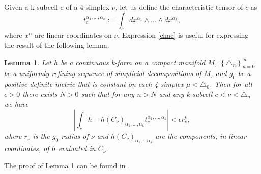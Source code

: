 \documentclass{article}
\newtheorem{lemma}{Lemma}
\begin{document}
Given a k-subcell c of a 4-simplex $\nu$, let us define the characteristic tensor of $c$ as
\begin{equation}\label{chac}
	t_{c}^{\alpha_1,\dots,\alpha_k}:=\int_{c}dx^{\alpha_1}\wedge\dots\wedge dx^{\alpha_k} , 
\end{equation}	
where $x^{\alpha}$ are linear coordinates on $\nu$. Expression \eqref{chac} is useful for expressing the result of the following lemma.
\begin{lemma}\label{lemma2}
	Let $h$ be a continuous k-form on a compact manifold $M$, $\left\{\triangle_n\right\}_{n=0}^{\infty}$ be a uniformly refining sequence of simplicial decompositions of $M$, and $g_0$ be a positive definite metric that is constant on each 4-simplex $\mu<\triangle_{0}$. Then for all $\epsilon>0$ there exists $N>0$ such that for any $n>N$ and any k-subcell $c<\nu<\triangle_{n}$ we have 
	\begin{equation}\label{aux1}
		\left|\int_{c}h-h\left(C_{\nu}\right)_{\alpha_1,\dots,\alpha_k}t_{c}^{\alpha_1,\dots,\alpha_k}\right|<\epsilon r_{\nu}^{k},
	\end{equation}
	where $r_{\nu}$ is the $g_0$ radius of $\nu$ and $h(C_{\nu})_{\alpha_1,\dots\alpha_k}$ are the components, in linear coordinates, of $h$ evaluated in $C_{\nu}$.	
\end{lemma}
The proof of Lemma \ref{lemma2} can be found in \cite{Rei1}. 
\end{document}
